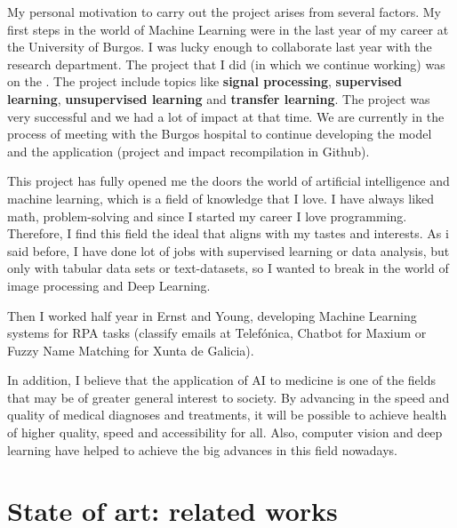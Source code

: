 My personal motivation to carry out the project arises from several factors. My first steps in the world of Machine Learning were in the last year of my career at the University of Burgos. I was lucky enough to collaborate last year with the  research department. The project that I did (in which we continue working) was on the . The project include topics like \textbf{signal processing}, \textbf{supervised learning}, \textbf{unsupervised learning} and \textbf{transfer learning}. The project was very successful and we had a lot of impact at that time. We are currently in the process of meeting with the Burgos hospital to continue developing the model and the application (project and impact recompilation in Github).

This project has fully opened me the doors the world of artificial intelligence and machine learning, which is a field of knowledge that I love. I have always liked math, problem-solving and since I started my career I love programming. Therefore, I find this field the ideal that aligns with my tastes and interests. As i said before, I have done lot of jobs with supervised learning or data analysis, but only with tabular data sets or text-datasets, so I wanted to break in the world of image processing and Deep Learning.

Then I worked half year in Ernst and Young, developing Machine Learning systems for RPA tasks (classify emails at Telefónica, Chatbot for Maxium or Fuzzy Name Matching for Xunta de Galicia).

In addition, I believe that the application of AI to medicine is one of the fields that may be of greater general interest to society. By advancing in the speed and quality of medical diagnoses and treatments, it will be possible to achieve health of higher quality, speed and accessibility for all. Also, computer vision and deep learning have helped to achieve the big advances in this field nowadays. 


\section{State of art: related works}
\textit{}

